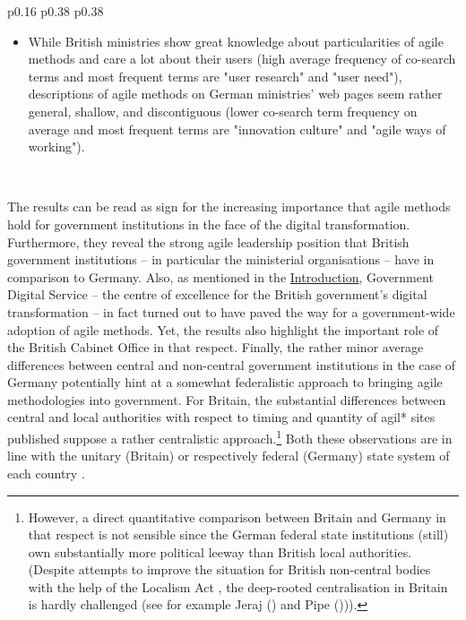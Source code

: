 \begin{spacing}{.9}
\begin{longtable}[ht!]{p{0.16\textwidth} p{0.38\textwidth} p{0.38\textwidth}}
{\begin{minipage}[t]{\linewidth}
\begin{itemize}[nosep, wide=0pt, leftmargin=*, after=\strut]
    \item While British ministries show great knowledge about particularities of agile methods and care a lot about their users (high average frequency of co-search terms and most frequent terms are "user research" and "user need"), descriptions of agile methods on German ministries' web pages seem rather general, shallow, and discontiguous (lower co-search term frequency on average and most frequent terms are "innovation culture" and "agile ways of working").
    \end{itemize}
    \end{minipage}}\\
    \hline
\end{longtable}
\end{spacing}
\endgroup
\vspace{-0.1cm}


The results can be read as sign for the increasing importance that agile methods hold for government institutions in the face of the digital transformation. Furthermore, they reveal the strong agile leadership position that British government institutions – in particular the ministerial organisations – have in comparison to Germany. Also, as mentioned in the \hyperref[Introduction]{Introduction}, Government Digital Service – the centre of excellence for the British government's digital transformation – in fact turned out to have paved the way for a government-wide adoption of agile methods. Yet, the results also highlight the important role of the British Cabinet Office in that respect. Finally, the rather minor average differences between central and non-central government institutions in the case of Germany potentially hint at a somewhat federalistic approach to bringing agile methodologies into government. For Britain, the substantial differences between central and local authorities with respect to timing and quantity of agil* sites published suppose a rather centralistic approach.\footnote{However, a direct quantitative comparison between Britain and Germany in that respect is not sensible since the German federal state institutions (still) own substantially more political leeway than British local authorities. (Despite attempts to improve the situation for British non-central bodies with the help of the Localism Act \parencite{Legislation.gov.uk2011}, the deep-rooted centralisation in Britain is hardly challenged (see for example Jeraj (\cite*{Jeraj2013}) and Pipe (\cite*{ Pipe2013}))).} Both these observations are in line with the unitary (Britain) or respectively federal (Germany) state system of each country \parencite{Elazar1997}. 

